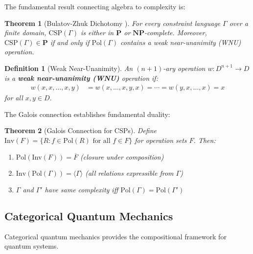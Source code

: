 \documentclass[11pt,a4paper]{article}
\newtheorem{theorem}{Theorem}[section]
\newtheorem{definition}{Definition}[section]
\theoremstyle{remark}
\theoremstyle{definition}
\begin{document}
The fundamental result connecting algebra to complexity is:

\begin{theorem}[Bulatov-Zhuk Dichotomy \cite{Bulatov2017,Zhuk2020}]
For every constraint language $\Gamma$ over a finite domain, $\text{CSP}(\Gamma)$ is either in $\mathbf{P}$ or $\mathbf{NP}$-complete. Moreover, $\text{CSP}(\Gamma) \in \mathbf{P}$ if and only if $\text{Pol}(\Gamma)$ contains a weak near-unanimity (WNU) operation.
\end{theorem}

\begin{definition}[Weak Near-Unanimity]
An $(n+1)$-ary operation $w: D^{n+1} \to D$ is a \textbf{weak near-unanimity (WNU)} operation if:
\begin{align}
w(x, x, \ldots, x, y) &= w(x, \ldots, x, y, x) = \cdots = w(y, x, \ldots, x) = x
\end{align}
for all $x, y \in D$.
\end{definition}

The Galois connection establishes fundamental duality:

\begin{theorem}[Galois Connection for CSPs]
\label{thm:galois}
Define $\text{Inv}(F) = \{R : f \in \text{Pol}(R) \text{ for all } f \in F\}$ for operation sets $F$. Then:
\begin{enumerate}[label=(\roman*)]
\item $\text{Pol}(\text{Inv}(F)) = \overline{F}$ (closure under composition)
\item $\text{Inv}(\text{Pol}(\Gamma)) = \langle \Gamma \rangle$ (all relations expressible from $\Gamma$)
\item $\Gamma$ and $\Gamma'$ have same complexity iff $\text{Pol}(\Gamma) = \text{Pol}(\Gamma')$
\end{enumerate}
\end{theorem}

\subsection{Categorical Quantum Mechanics}

Categorical quantum mechanics provides the compositional framework for quantum systems.
\end{document}
